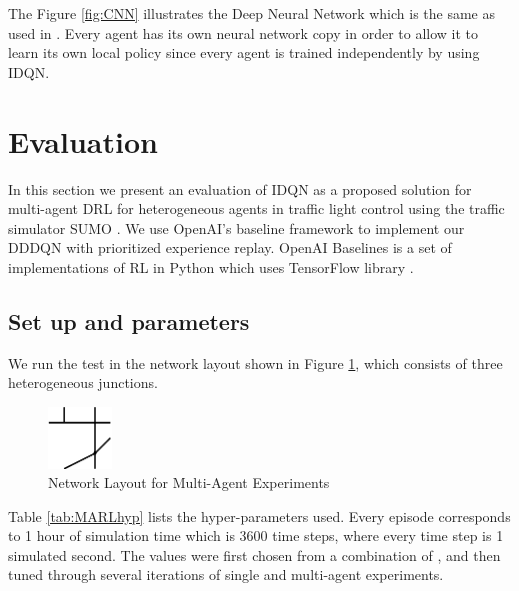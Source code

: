 \documentclass{llncs}
\begin{document}
The Figure \ref{fig:CNN} illustrates the Deep Neural Network which is the same as used in \cite{Wang2016}. Every agent has its own neural network copy in order to allow it to learn its own local policy since every agent is trained independently by using IDQN.

\section{Evaluation} \label{evaluation}

In this section we present an evaluation of IDQN as a proposed solution for multi-agent DRL for heterogeneous agents in traffic light control using the traffic simulator SUMO \cite{SUMO2012}. We use OpenAI's baseline framework \cite{baselines} to implement our DDDQN with prioritized experience replay. OpenAI Baselines is a set of implementations of RL in Python which uses TensorFlow library \cite{Abadi2016}. 

\subsection{Set up and parameters}

We run the test in the network layout shown in Figure \ref{fig:simSetup}, which consists of three heterogeneous junctions. 

\begin{figure}
\begin{center}
  \includegraphics[width=0.15\textwidth]{images/MARL_env.png}
  \caption{Network Layout for Multi-Agent Experiments}
  \label{fig:simSetup}
\end{center}
\end{figure}

Table \ref{tab:MARLhyp} lists the hyper-parameters used. Every episode corresponds to 1 hour of simulation time which is 3600 time steps, where every time step is 1 simulated second. The values were first chosen from a combination of \cite{Liang2018,SchaulQAS15,VanDerPol2016,Wang2016}, and then tuned through several iterations of single and multi-agent experiments.
\end{document}
